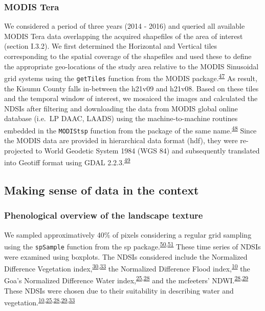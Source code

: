 \documentclass[12pt,oneside]{article}
\begin{document}
\hypertarget{I.3.3}{%
\subsubsection{MODIS Tera}\label{I.3.3}}

We considered a period of three years (2014 - 2016) and queried all
available MODIS Tera data overlapping the acquired shapefiles of the
area of interest (section I.3.2). We first determined the Horizontal and
Vertical tiles corresponding to the spatial coverage of the shapefiles
and used these to define the appropriate geo-locations of the study area
relative to the MODIS Sinusoidal grid systems using the
\texttt{getTiles} function from the MODIS
package.\textsuperscript{\protect\hyperlink{ref-Mattiuzzi_and_Detsch_2018}{47}}
As result, the Kisumu County falls in-between the h21v09 and h21v08.
Based on these tiles and the temporal window of interest, we mosaiced
the images and calculated the NDSIs after filtering and downloading the
data from MODIS global online database (i.e.~LP DAAC, LAADS) using the
machine-to-machine routines embedded in the \texttt{MODIStsp} function
from the package of the same
name.\textsuperscript{\protect\hyperlink{ref-Busetto_and_ranghetti_2016}{48}}
Since the MODIS data are provided in hierarchical data format (hdf),
they were re-projected to World Geodetic System 1984 (WGS 84) and
subsequently translated into Geotiff format using GDAL
2.2.3.\textsuperscript{\protect\hyperlink{ref-GDAL_OGRcontributors_2018}{49}}

\hypertarget{I.4}{%
\subsection{Making sense of data in the context}\label{I.4}}

\hypertarget{I.4.1}{%
\subsubsection{Phenological overview of the landscape
texture}\label{I.4.1}}

We sampled approximatively 40\% of pixels considering a regular grid
sampling using the \texttt{spSample} function from the sp
package.\textsuperscript{\protect\hyperlink{ref-Bivand_et_al_2013}{50},\protect\hyperlink{ref-Pebesma_Bivand_2005}{51}}
These time series of NDSIs were examined using boxplots. The NDSIs
considered include the Normalized Difference Vegetation
index,\textsuperscript{\protect\hyperlink{ref-Rouse_et_al_1973}{30},\protect\hyperlink{ref-Tucker_1979}{33}}
the Normalized Difference Flood
index,\textsuperscript{\protect\hyperlink{ref-Boschetti_et_al_2014}{10}}
the Goa's Normalized Difference Water
index,\textsuperscript{\protect\hyperlink{ref-Gao_1996}{25},\protect\hyperlink{ref-Ji_et_al_2009}{28}}
and the mcfeeters'
NDWI.\textsuperscript{\protect\hyperlink{ref-Ji_et_al_2009}{28},\protect\hyperlink{ref-McFeeters_1996}{29}}
These NDSIs were chosen due to their suitability in describing water and
vegetation.\textsuperscript{\protect\hyperlink{ref-Boschetti_et_al_2014}{10},\protect\hyperlink{ref-Gao_1996}{25},\protect\hyperlink{ref-Ji_et_al_2009}{28},\protect\hyperlink{ref-McFeeters_1996}{29},\protect\hyperlink{ref-Tucker_1979}{33}}
\end{document}
